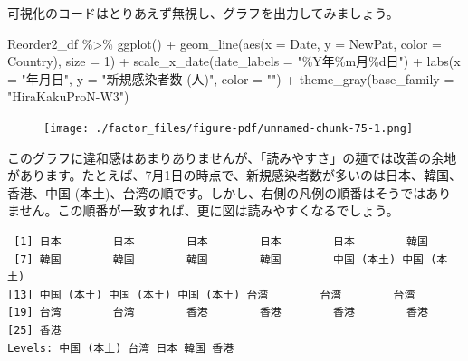 \documentclass[
  a4paper,
  pandoc,
  ja=standard,
  jafont=haranoaji]{bxjsbook}
\newenvironment{Shaded}{\begin{snugshade}}{\end{snugshade}}
\newcommand{\AttributeTok}[1]{\textcolor[rgb]{0.00,0.48,0.65}{#1}}
\newcommand{\DecValTok}[1]{\textcolor[rgb]{0.68,0.00,0.00}{#1}}
\newcommand{\FunctionTok}[1]{\textcolor[rgb]{0.28,0.35,0.67}{#1}}
\newcommand{\NormalTok}[1]{\textcolor[rgb]{0.00,0.48,0.65}{#1}}
\newcommand{\SpecialCharTok}[1]{\textcolor[rgb]{0.37,0.37,0.37}{#1}}
\newcommand{\StringTok}[1]{\textcolor[rgb]{0.13,0.47,0.30}{#1}}
\begin{document}
可視化のコードはとりあえず無視し、グラフを出力してみましょう。

\begin{Shaded}
\begin{Highlighting}[numbers=left,,]
\NormalTok{Reorder2\_df }\SpecialCharTok{\%\textgreater{}\%}
  \FunctionTok{ggplot}\NormalTok{() }\SpecialCharTok{+}
  \FunctionTok{geom\_line}\NormalTok{(}\FunctionTok{aes}\NormalTok{(}\AttributeTok{x =}\NormalTok{ Date, }\AttributeTok{y =}\NormalTok{ NewPat, }\AttributeTok{color =}\NormalTok{ Country),}
            \AttributeTok{size =} \DecValTok{1}\NormalTok{) }\SpecialCharTok{+}
  \FunctionTok{scale\_x\_date}\NormalTok{(}\AttributeTok{date\_labels =} \StringTok{"\%Y年\%m月\%d日"}\NormalTok{) }\SpecialCharTok{+}
  \FunctionTok{labs}\NormalTok{(}\AttributeTok{x =} \StringTok{"年月日"}\NormalTok{, }\AttributeTok{y =} \StringTok{"新規感染者数 (人)"}\NormalTok{, }\AttributeTok{color =} \StringTok{""}\NormalTok{) }\SpecialCharTok{+}
  \FunctionTok{theme\_gray}\NormalTok{(}\AttributeTok{base\_family =} \StringTok{"HiraKakuProN{-}W3"}\NormalTok{)}
\end{Highlighting}
\end{Shaded}

\begin{figure}[H]

{\centering \texttt{[image: ./factor\_files/figure-pdf/unnamed-chunk-75-1.png]}

}

\end{figure}

このグラフに違和感はあまりありませんが、「読みやすさ」の麺では改善の余地があります。たとえば、7月1日の時点で、新規感染者数が多いのは日本、韓国、香港、中国
(本土)、台湾の順です。しかし、右側の凡例の順番はそうではありません。この順番が一致すれば、更に図は読みやすくなるでしょう。

\begin{Shaded}
\end{Shaded}

\begin{verbatim}
 [1] 日本        日本        日本        日本        日本        韓国       
 [7] 韓国        韓国        韓国        韓国        中国 (本土) 中国 (本土)
[13] 中国 (本土) 中国 (本土) 中国 (本土) 台湾        台湾        台湾       
[19] 台湾        台湾        香港        香港        香港        香港       
[25] 香港       
Levels: 中国 (本土) 台湾 日本 韓国 香港
\end{verbatim}
\end{document}
